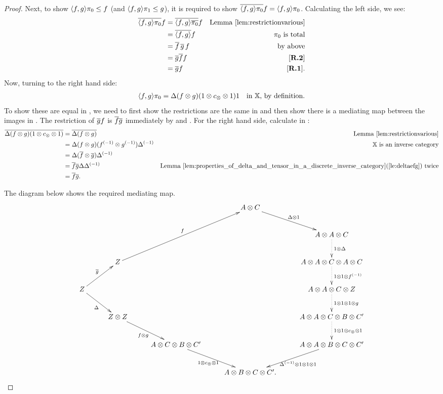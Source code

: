 \begin{proof}
  Next, to show $\langle f,g\rangle \pi_0 \le f$ (and $\langle f,g\rangle \pi_1 \le g$), it is required to show
  $\overline{\langle f,g\rangle\pi_{0}} f = \langle f,g\rangle \pi_{0}$. Calculating the left side, we see:
  \begin{align*}
    \overline{\langle f,g\rangle\pi_{0}} f &=\overline{\langle f,g\rangle\overline{\pi_{0}}} f &\text{Lemma \ref{lem:restrictionvarious}}\\
    &=\overline{\langle f,g\rangle} f &\pi_{0}\text{ is total}\\
    &=\overline{f}\,\overline{g}\, f&\text{ by above}\\
    &=\overline{g} \overline{f} f & [\text{\bfseries {R}.{2}}]\\
    &=\overline{g} f& [\text{\bfseries {R}.{1}}].
  \end{align*}
  Now, turning to the right hand side:
  \begin{align*}
    \langle f,g\rangle\pi_{0} &= \Delta(f\otimes g)(1\otimes c_{\otimes}\otimes1) 1 &\text{in \ensuremath{\mathbb{X}}, by definition.}
  \end{align*}
  To show these are equal in \Xt, we need to first show the restrictions are the same in \X and
  then show there is a mediating map between the images in \X. The restriction of $\overline{g} f$ is
  $\overline{f} \overline{g}$ immediately by \rthree and \rtwo. For the right hand side, calculate in \X:
  \begin{align*}
    \overline{\Delta(f\otimes g)(1\otimes c_{\otimes}\otimes1)}
      & = \overline{\Delta(f\otimes g)} & \text{Lemma  \ref{lem:restrictionvarious}}\\
    & = \Delta(f\otimes g)({f}^{(-1)} \otimes {g}^{(-1)}){\Delta}^{(-1)} & \mathbb{X} \text{ is an inverse category}\\
    & = \Delta(\overline{f} \otimes \overline{g}){\Delta}^{(-1)} & \\
    & = \overline{f} \overline{g} \Delta{\Delta}^{(-1)}
      & \text{Lemma \ref{lem:properties_of_delta_and_tensor_in_a_discrete_inverse_category}(\ref{le:deltaefg}) twice}\\
    & = \overline{f} \overline{g}.
  \end{align*}

  The diagram below shows the required mediating map.
  \[
    \xymatrix @C=27pt @R=25pt{
      & & & A \* C \ar[dr]^{\Delta\*1}\\
      & & & & A \* A \* C \ar@{.>}[d]^{1\*\Delta}\\
      &Z\ar[uurr]^{f}& & & A \* A\* C \* A \* C\ar@{.>}[d]^{1\*1\*\inv{f}}\\
      Z\ar[ur]^{\rst{g}}\ar[dr]_{\Delta}&& & &  A \* A \*C \* Z \ar@{.>}[d]^{1 \* 1 \* 1 \* g}\\
      &Z\*Z\ar[dr]_{f\* g}& & & A\*A\*C\*B\*C'\ar@{.>}[d]^{1\*1\*c_{\*}\*1}\\
      &&A\*C\*B\* C'\ar[dr]_{1\*c_{\*}\*1}&&A\*A\*B\*C\*C'\ar[dl]^{\inv{\Delta}\*1\*1\*1}\\
      & & & A\*B\*C\*C'.
    }
  \]
\end{proof}

